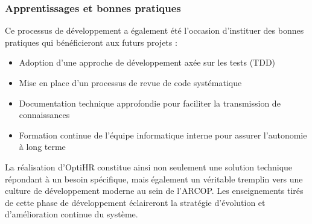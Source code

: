 \subsubsection{Apprentissages et bonnes pratiques}

Ce processus de développement a également été l'occasion d'instituer des bonnes pratiques qui bénéficieront aux futurs projets :

\begin{itemize}
    \item Adoption d'une approche de développement axée sur les tests (TDD)
    \item Mise en place d'un processus de revue de code systématique
    \item Documentation technique approfondie pour faciliter la transmission de connaissances
    \item Formation continue de l'équipe informatique interne pour assurer l'autonomie à long terme
\end{itemize}

La réalisation d'OptiHR constitue ainsi non seulement une solution technique répondant à un besoin spécifique, mais également un véritable tremplin vers une culture de développement moderne au sein de l'ARCOP. Les enseignements tirés de cette phase de développement éclaireront la stratégie d'évolution et d'amélioration continue du système.